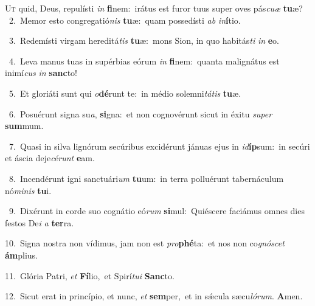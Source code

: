 \lettrine{\initial\textcolor{\initialcolor}{U}}{t} quid, Deus, repulísti \textit{in} \textbf{fi}\-nem:~\star irátus est furor tuus super oves pás\-\textit{cu}\-\textit{æ} \textbf{tu}\-æ?\\
{\numbfont\textcolor{\numbcolor}{~2.}}~Memor esto congregatió\textit{nis} \textbf{tu}\-æ:~\star quam possedísti \textit{ab} \textit{in}\-\textbf{í}tio.\par
{\numbfont\textcolor{\numbcolor}{~3.}}~Redemísti virgam hereditá\textit{tis} \textbf{tu}\-æ:~\star mons Sion, in quo habitás\textit{ti} \textit{in} \textbf{e}\-o.\par
{\numbfont\textcolor{\numbcolor}{~4.}}~Leva manus tuas in supérbias eórum \textit{in} \textbf{fi}\-nem:~\star quanta malignátus est inimí\textit{cus} \textit{in} \textbf{sanc}\-to!\par
{\numbfont\textcolor{\numbcolor}{~5.}}~Et gloriáti sunt qui \textit{o}\-\textbf{dé}runt te:~\star in médio solemni\-\textit{tá}\-\textit{tis} \textbf{tu}\-æ.\par
{\numbfont\textcolor{\numbcolor}{~6.}}~Posuérunt signa su\-\textit{a}\-, \textbf{si}\-gna:~\star et non cognovérunt sicut in éxitu \textit{su}\-\textit{per} \textbf{sum}\-mum.\par
{\numbfont\textcolor{\numbcolor}{~7.}}~Quasi in silva lignórum secúribus excidérunt jánuas ejus in \textit{id}\-\textbf{íp}sum:~\star in secúri et áscia deje\-\textit{cé}\-\textit{runt} \textbf{e}\-am.\par
{\numbfont\textcolor{\numbcolor}{~8.}}~Incendérunt igni sanctuári\textit{um} \textbf{tu}\-um:~\star in terra polluérunt tabernáculum nó\-\textit{mi}\-\textit{nis} \textbf{tu}\-i.\par
{\numbfont\textcolor{\numbcolor}{~9.}}~Dixérunt in corde suo cognátio eó\textit{rum} \textbf{si}\-mul:~\star Quiéscere faciámus omnes dies festos De\textit{i} \textit{a} \textbf{ter}\-ra.\par
{\numbfont\textcolor{\numbcolor}{10.}}~Signa nostra non vídimus, jam non est \textit{pro}\-\textbf{phé}ta:~\star et nos non co\-\textit{gnó}\-\textit{scet} \textbf{ám}\-plius.\par
{\numbfont\textcolor{\numbcolor}{11.}}~Glória Patri, \textit{et} \textbf{Fí}\-lio,~\star et Spirí\-\textit{tu}\-\textit{i} \textbf{Sanc}\-to.\par
{\numbfont\textcolor{\numbcolor}{12.}}~Sicut erat in princípio, et nunc, \textit{et} \textbf{sem}\-per,~\star et in sǽcula sæcu\-\textit{ló}\-\textit{rum}. \textbf{A}\-men.\par
